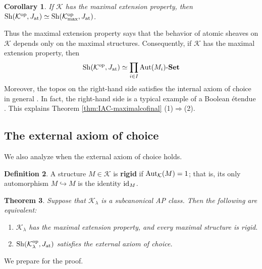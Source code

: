 \documentclass[10pt]{amsart}
\numberwithin{equation}{section}
\theoremstyle{plain}
\newtheorem{theorem}{Theorem}[section]
\newtheorem{cor}[theorem]{Corollary}
\newtheorem{obs}[theorem]{Observation}
\theoremstyle{definition}
\newtheorem{definition}[theorem]{Definition}
\newcommand{\K}{\mathcal{K}}
\newcommand{\surj}{\twoheadrightarrow}
\newcommand{\mono}{\rightarrowtail}
\newcommand{\embed}{\hookrightarrow}
\begin{document}
\begin{cor}
If $\K$ has the maximal extension property, then ${\rm Sh}(\K^{\rm op},J_{\rm at})\simeq{\rm Sh}(\K_{\rm max}^{\rm op},J_{\rm at})$.
\end{cor}

Thus the maximal extension property says that the behavior of atomic sheaves on $\K$ depends only on the maximal structures.
Consequently, if $\K$ has the maximal extension property, then
\begin{align}\label{equ:at-sheaf-maximal-automorphism}
{\rm Sh}(\K^{\rm op},J_{\rm at})\simeq\prod_{i\in I}{\rm Aut}(M_i)\text{-}{\bf Set}
\end{align}
Moreover, the topos on the right-hand side satisfies the internal axiom of choice in general \cite{Fre,FrSc90}.
In fact, the right-hand side is a typical example of a Boolean \'etendue \cite{FrSc90}.
This explains Theorem \ref{thm:IAC-maximalcofinal} (1)$\Rightarrow$(2).

\subsection{The external axiom of choice}

We also analyze when the external axiom of choice holds.

\begin{definition}
A structure $M\in\mathcal{K}$ is {\bf rigid} if ${\rm Aut}_\K(M)=1$; that is, its only automorphism $M\embed M$ is the identity ${\rm id}_M$.
\end{definition}

\begin{theorem}\label{thm:EAC-main-thm}
Suppose that $\K_\lambda$ is a subcanonical AP class.
Then the following are equivalent:
\begin{enumerate}
\item $\K_\lambda$ has the maximal extension property, and every maximal structure is rigid.
\item ${\rm Sh}(\K_\lambda^{\rm op},J_{\rm at})$ satisfies the external axiom of choice.
\end{enumerate}
\end{theorem}

We prepare for the proof.


%
\end{document}
